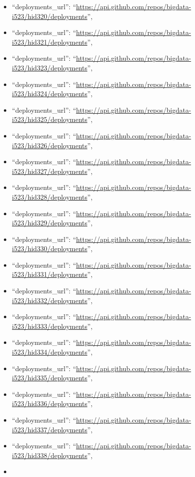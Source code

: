 \begin{itemize}
\item
  ``deployments\_url'':
  ``\url{https://api.github.com/repos/bigdata-i523/hid320/deployments}'',
\item
  ``deployments\_url'':
  ``\url{https://api.github.com/repos/bigdata-i523/hid321/deployments}'',
\item
  ``deployments\_url'':
  ``\url{https://api.github.com/repos/bigdata-i523/hid323/deployments}'',
\item
  ``deployments\_url'':
  ``\url{https://api.github.com/repos/bigdata-i523/hid324/deployments}'',
\item
  ``deployments\_url'':
  ``\url{https://api.github.com/repos/bigdata-i523/hid325/deployments}'',
\item
  ``deployments\_url'':
  ``\url{https://api.github.com/repos/bigdata-i523/hid326/deployments}'',
\item
  ``deployments\_url'':
  ``\url{https://api.github.com/repos/bigdata-i523/hid327/deployments}'',
\item
  ``deployments\_url'':
  ``\url{https://api.github.com/repos/bigdata-i523/hid328/deployments}'',
\item
  ``deployments\_url'':
  ``\url{https://api.github.com/repos/bigdata-i523/hid329/deployments}'',
\item
  ``deployments\_url'':
  ``\url{https://api.github.com/repos/bigdata-i523/hid330/deployments}'',
\item
  ``deployments\_url'':
  ``\url{https://api.github.com/repos/bigdata-i523/hid331/deployments}'',
\item
  ``deployments\_url'':
  ``\url{https://api.github.com/repos/bigdata-i523/hid332/deployments}'',
\item
  ``deployments\_url'':
  ``\url{https://api.github.com/repos/bigdata-i523/hid333/deployments}'',
\item
  ``deployments\_url'':
  ``\url{https://api.github.com/repos/bigdata-i523/hid334/deployments}'',
\item
  ``deployments\_url'':
  ``\url{https://api.github.com/repos/bigdata-i523/hid335/deployments}'',
\item
  ``deployments\_url'':
  ``\url{https://api.github.com/repos/bigdata-i523/hid336/deployments}'',
\item
  ``deployments\_url'':
  ``\url{https://api.github.com/repos/bigdata-i523/hid337/deployments}'',
\item
  ``deployments\_url'':
  ``\url{https://api.github.com/repos/bigdata-i523/hid338/deployments}'',
\item

\end{itemize}
